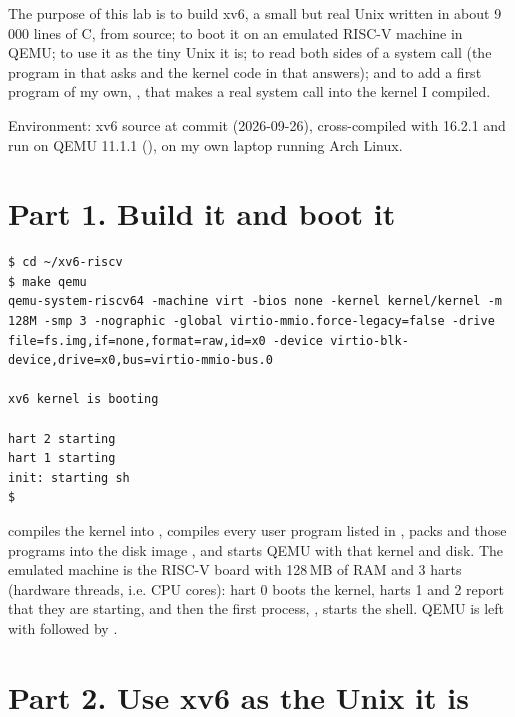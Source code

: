 \documentclass[11pt,a4paper]{article}
\begin{document}
\utmtitlepage
\tableofcontents
\newpage


The purpose of this lab is to build xv6, a small but real Unix written in about 9\,000 lines
of C, from source; to boot it on an emulated RISC-V machine in QEMU; to use it as the tiny Unix
it is; to read both sides of a system call (the program in  that asks and the
kernel code in  that answers); and to add a first program of my own,
, that makes a real system call into the kernel I compiled.

Environment: xv6 source  at commit  (2026-09-26),
cross-compiled with  16.2.1 and run on QEMU 11.1.1
(), on my own laptop running Arch Linux.

\section{Part 1. Build it and boot it}

\begin{lstlisting}
$ cd ~/xv6-riscv
$ make qemu
qemu-system-riscv64 -machine virt -bios none -kernel kernel/kernel -m 128M -smp 3 -nographic -global virtio-mmio.force-legacy=false -drive file=fs.img,if=none,format=raw,id=x0 -device virtio-blk-device,drive=x0,bus=virtio-mmio-bus.0

xv6 kernel is booting

hart 2 starting
hart 1 starting
init: starting sh
$
\end{lstlisting}

 compiles the kernel into , compiles every user program
listed in , packs  and those programs into the disk image
, and starts QEMU with that kernel and disk. The emulated machine is the RISC-V
 board with 128\,MB of RAM and 3 harts (hardware threads, i.e. CPU cores): hart 0
boots the kernel, harts 1 and 2 report that they are starting, and then the first process,
, starts the shell. QEMU is left with  followed by .

\section{Part 2. Use xv6 as the Unix it is}
\end{document}
